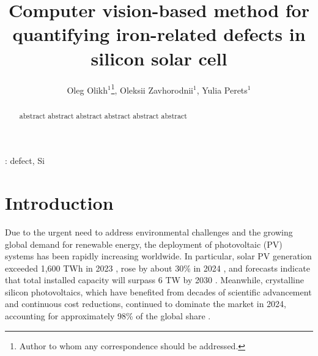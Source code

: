 \documentclass[10pt]{iopart}
\begin{document}
\title[Computer vision-based method for quantifying iron-related defects in silicon solar cell]{Computer vision-based method for quantifying iron-related defects in silicon solar cell}

\author{Oleg Olikh$^1$\footnote{Author to whom any correspondence should be addressed.}, Oleksii Zavhorodnii$^1$, Yulia Perets$^1$}

\address{$^1$Physics Faculty, Taras Shevchenko National University of Kyiv, Kyiv 01601, Ukraine}


\begin{abstract}
abstract abstract abstract abstract abstract abstract 
\end{abstract}

%
\vspace{2pc}
: defect, Si

\submitto{\SST}
%

\ioptwocol
%


\section{Introduction}\label{sec:Int}

Due to the urgent need to address environmental challenges and the growing global demand for renewable energy, the deployment of photovoltaic (PV) systems has been rapidly increasing worldwide. 
In particular, solar PV generation exceeded 1,600 TWh in 2023 \cite{IEA2024Renewables, OSAMA2025}, rose by about 30\% in 2024 \cite{Prometheus2025}, and forecasts indicate that total installed capacity will surpass 6 TW by 2030 \cite{IEA2024Renewables}. 
Meanwhile, crystalline silicon photovoltaics, which have benefited from decades of scientific advancement and continuous cost reductions, continued to dominate the market in 2024, accounting for approximately 98\% of the global share \cite{Fischer2025ITRPV, THOME2025}.
\end{document}
